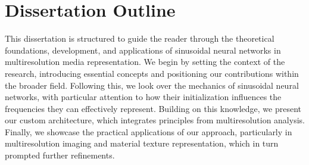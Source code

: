 


\section{Dissertation Outline}


This dissertation is structured to guide the reader through the theoretical foundations, development, and applications of sinusoidal neural networks in multiresolution media representation. We begin by setting the context of the research, introducing essential concepts and positioning our contributions within the broader field. Following this, we look over the mechanics of sinusoidal neural networks, with particular attention to how their initialization influences the frequencies they can effectively represent. Building on this knowledge, we present our custom architecture, which integrates principles from multiresolution analysis. Finally, we showcase the practical applications of our approach, particularly in multiresolution imaging and material texture representation, which in turn prompted further refinements.

